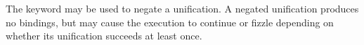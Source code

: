 The keyword  may be used to negate a unification. A negated unification
produces no bindings, but may cause the execution to continue or fizzle
depending on whether its unification succeeds at least once.

\begin{figure}[H]
    \centering
    \parbox[t]{0.45\linewidth}{
        \begin{prooftree}
        \end{prooftree}
    }
    \parbox[t]{0.45\linewidth}{
        \begin{prooftree}
        \end{prooftree}
    }
\end{figure}
